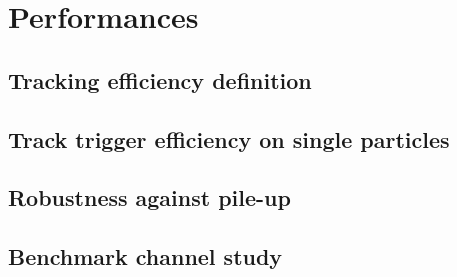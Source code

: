 \section{Performances}

\subsection{Tracking efficiency definition}

\subsection{Track trigger efficiency on single particles}

\subsection{Robustness against pile-up}

\subsection{Benchmark channel study}


\clearpage
